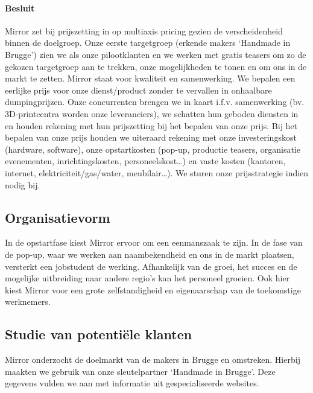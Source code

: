 \paragraph{Besluit} %
\label{par:besluit}
Mirror zet bij prijszetting in op multiaxis pricing gezien de verscheidenheid binnen de doelgroep. Onze eerste targetgroep (erkende makers `Handmade in Brugge') zien we als onze pilootklanten en we werken met gratis teasers om zo de gekozen targetgroep aan te trekken, onze mogelijkheden te tonen en om ons in de markt te zetten. Mirror staat voor kwaliteit en samenwerking. We bepalen een eerlijke prijs voor onze dienst/product zonder te vervallen in onhaalbare dumpingprijzen. Onze concurrenten brengen we in kaart i.f.v. samenwerking (bv. 3D-printcentra worden onze leveranciers), we schatten hun geboden diensten in en houden rekening met hun prijszetting bij het bepalen van onze prijs. Bij het bepalen van onze prijs houden we uiteraard rekening met onze investeringskost (hardware, software), onze opstartkosten (pop-up, productie teasers, organisatie evenementen, inrichtingskosten, personeelskost…) en vaste kosten (kantoren, internet, elektriciteit/gas/water, meubilair…). We sturen onze prijsstrategie indien nodig bij.


\subsection{Organisatievorm} %
\label{sub:organisatievorm}
In de opstartfase kiest Mirror ervoor om een eenmanszaak te zijn. In de fase van de pop-up, waar we werken aan naambekendheid en ons in de markt plaatsen, versterkt een jobstudent de werking. Afhankelijk van de groei, het succes en de mogelijke uitbreiding naar andere regio’s kan het personeel groeien. Ook hier kiest Mirror voor een grote zelfstandigheid en eigenaarschap van de toekomstige werknemers.

\subsection{Studie van potentiële klanten} %
\label{sub:studie_van_potentiële_klanten}
Mirror onderzocht de doelmarkt van de makers in Brugge en omstreken. Hierbij maakten we gebruik van onze sleutelpartner `Handmade in Brugge'. Deze gegevens vulden we aan met informatie uit gespecialiseerde websites.

